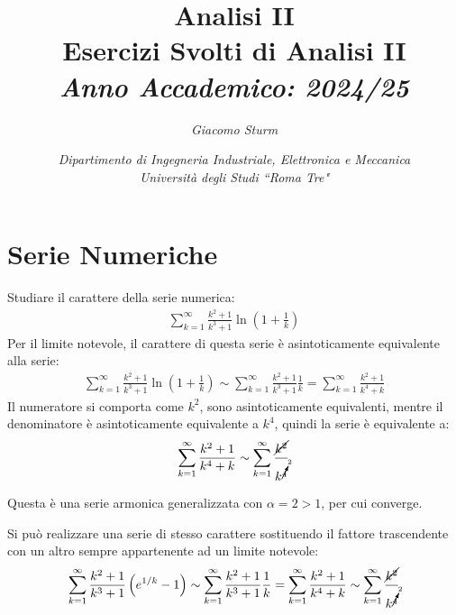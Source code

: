 \documentclass{article}
\numberwithin{equation}{subsection}
\begin{document}
\title{%
    \textbf{Analisi II}  \\ 
    \large Esercizi Svolti di Analisi II \\
    \textit{Anno Accademico: 2024/25}}
\author{\textit{Giacomo Sturm}}
\date{\textit{Dipartimento di Ingegneria Industriale, Elettronica e Meccanica \\
Università degli Studi ``Roma Tre"}} 

\maketitle
\thispagestyle{link}

\clearpage


\pagestyle{fancy}
\fancyhead{}\fancyfoot{}
\fancyfoot[C]{\thepage}

\tableofcontents

\clearpage
{}


\section{Serie Numeriche}

Studiare il carattere della serie numerica:
\begin{gather*}
    \displaystyle\sum_{k=1}^\infty\frac{k^2+1}{k^3+1}\ln\left(1+\frac{1}{k}\right)
\end{gather*}
Per il limite notevole, il carattere di questa serie è asintoticamente equivalente alla serie:
\begin{gather*}
    \displaystyle\sum_{k=1}^\infty\frac{k^2+1}{k^3+1}\ln\left(1+\frac{1}{k}\right)\sim
    \displaystyle\sum_{k=1}^\infty\frac{k^2+1}{k^3+1}\frac{1}{k}=
    \displaystyle\sum_{k=1}^\infty\frac{k^2+1}{k^4+k}
\end{gather*}
Il numeratore si comporta come $k^2$, sono asintoticamente equivalenti, mentre il denominatore è asintoticamente equivalente a $k^4$, quindi la serie è equivalente a:
\begin{gather*}
    \displaystyle\sum_{k=1}^\infty\frac{k^2+1}{k^4+k}\sim
    \displaystyle\sum_{k=1}^\infty\frac{\cancel{k^2}}{k^{\cancelto{2}{4}}}
\end{gather*}

Questa è una serie armonica generalizzata con $\alpha=2>1$, per cui converge. 


Si può realizzare una serie di stesso carattere sostituendo il fattore trascendente con un altro sempre appartenente ad un limite notevole:
\begin{gather*}
    \displaystyle\sum_{k=1}^\infty\frac{k^2+1}{k^3+1}\left(e^{1/k}-1\right)\sim
    \displaystyle\sum_{k=1}^\infty\frac{k^2+1}{k^3+1}\frac{1}{k}=
    \displaystyle\sum_{k=1}^\infty\frac{k^2+1}{k^4+k}\sim
    \displaystyle\sum_{k=1}^\infty\frac{\cancel{k^2}}{k^{\cancelto{2}{4}}}
\end{gather*}
\end{document}
